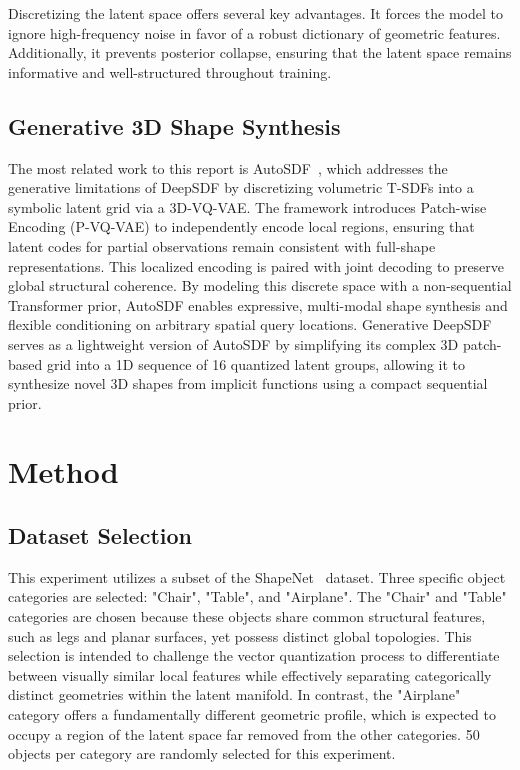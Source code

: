 \documentclass[11pt, a4paper]{article}
\begin{document}
Discretizing the latent space offers several key advantages. It forces the model to ignore high-frequency noise in favor of a robust dictionary of geometric features. Additionally, it prevents posterior collapse, ensuring that the latent space remains informative and well-structured throughout training.

\subsection{Generative 3D Shape Synthesis}
The most related work to this report is AutoSDF~\cite{mittal2023autosdfshapepriors3d}, which addresses the generative limitations of DeepSDF by discretizing volumetric T-SDFs into a symbolic latent grid via a 3D-VQ-VAE. The framework introduces Patch-wise Encoding (P-VQ-VAE) to independently encode local regions, ensuring that latent codes for partial observations remain consistent with full-shape representations. This localized encoding is paired with joint decoding to preserve global structural coherence. By modeling this discrete space with a non-sequential Transformer prior, AutoSDF enables expressive, multi-modal shape synthesis and flexible conditioning on arbitrary spatial query locations. Generative DeepSDF serves as a lightweight version of AutoSDF by simplifying its complex 3D patch-based grid into a 1D sequence of 16 quantized latent groups, allowing it to synthesize novel 3D shapes from implicit functions using a compact sequential prior.


\section{Method}

\subsection{Dataset Selection}
This experiment utilizes a subset of the ShapeNet~\cite{shapenet2015} dataset. Three specific object categories are selected: "Chair", "Table", and "Airplane". The "Chair" and "Table" categories are chosen because these objects share common structural features, such as legs and planar surfaces, yet possess distinct global topologies. This selection is intended to challenge the vector quantization process to differentiate between visually similar local features while effectively separating categorically distinct geometries within the latent manifold. In contrast, the "Airplane" category offers a fundamentally different geometric profile, which is expected to occupy a region of the latent space far removed from the other categories. 50 objects per category are randomly selected for this experiment.
\end{document}
